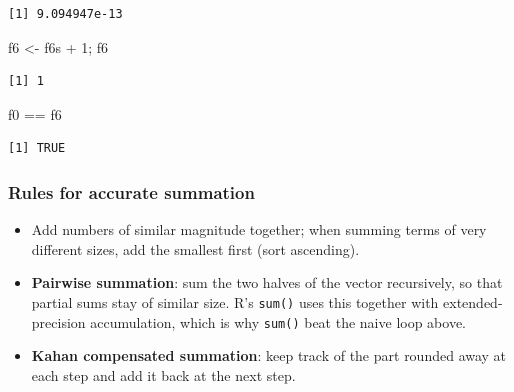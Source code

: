 \documentclass[
  letterpaper,
  DIV=11,
  numbers=noendperiod]{scrreprt}
\newenvironment{Shaded}{\begin{snugshade}}{\end{snugshade}}
\newcommand{\DecValTok}[1]{\textcolor[rgb]{0.68,0.00,0.00}{#1}}
\newcommand{\NormalTok}[1]{\textcolor[rgb]{0.00,0.23,0.31}{#1}}
\newcommand{\OtherTok}[1]{\textcolor[rgb]{0.00,0.23,0.31}{#1}}
\newcommand{\SpecialCharTok}[1]{\textcolor[rgb]{0.37,0.37,0.37}{#1}}
\begin{document}
\begin{verbatim}
[1] 9.094947e-13
\end{verbatim}

\begin{Shaded}
\begin{Highlighting}[]
\NormalTok{f6 }\OtherTok{\textless{}{-}}\NormalTok{ f6s }\SpecialCharTok{+} \DecValTok{1}\NormalTok{; f6}
\end{Highlighting}
\end{Shaded}

\begin{verbatim}
[1] 1
\end{verbatim}

\begin{Shaded}
\begin{Highlighting}[]
\NormalTok{f0 }\SpecialCharTok{==}\NormalTok{ f6}
\end{Highlighting}
\end{Shaded}

\begin{verbatim}
[1] TRUE
\end{verbatim}

\subsubsection*{Rules for accurate
summation}\label{rules-for-accurate-summation}

\begin{itemize}
\item
  Add numbers of similar magnitude together; when summing terms of very
  different sizes, add the smallest first (sort ascending).
\item
  \textbf{Pairwise summation}: sum the two halves of the vector
  recursively, so that partial sums stay of similar size. R's
  \texttt{sum()} uses this together with extended-precision
  accumulation, which is why \texttt{sum()} beat the naive loop above.
\item
  \textbf{Kahan compensated summation}: keep track of the part rounded
  away at each step and add it back at the next step.
\end{itemize}
\end{document}

